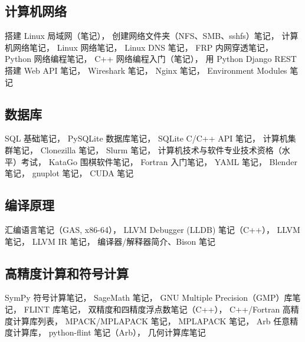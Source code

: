 \subsection{计算机网络}
搭建 Linux 局域网（笔记），
创建网络文件夹（NFS、SMB、sshfs）笔记，
计算机网络笔记，
Linux 网络笔记，
Linux DNS 笔记，
FRP 内网穿透笔记，
Python 网络编程笔记，
C++ 网络编程入门（笔记），
用 Python Django REST 搭建 Web API 笔记，
Wireshark 笔记，
Nginx 笔记，
Environment Modules 笔记

\subsection{数据库}
SQL 基础笔记，
PySQLite 数据库笔记，
SQLite C/C++ API 笔记，
计算机集群笔记，
Clonezilla 笔记，
Slurm 笔记，
计算机技术与软件专业技术资格（水平）考试，
KataGo 围棋软件笔记，
Fortran 入门笔记，
YAML 笔记，
Blender 笔记，
gnuplot 笔记，
CUDA 笔记

\subsection{编译原理}
汇编语言笔记（GAS, x86-64），
LLVM Debugger (LLDB) 笔记（C++），
LLVM 笔记，
LLVM IR 笔记，
编译器/解释器简介、Bison 笔记

\subsection{高精度计算和符号计算}
SymPy 符号计算笔记，
SageMath 笔记，
GNU Multiple Precision（GMP）库笔记，
FLINT 库笔记，
双精度和四精度浮点数笔记（C++），
C++/Fortran 高精度计算库列表，
MPACK/MPLAPACK 笔记，
MPLAPACK 笔记，
Arb 任意精度计算库，
python-flint 笔记（Arb），
几何计算库笔记

